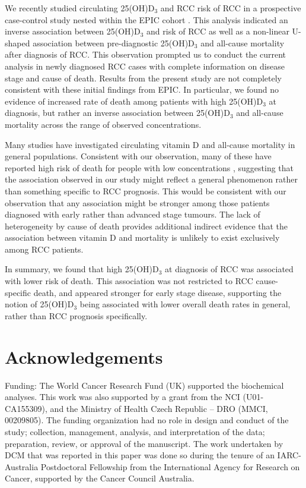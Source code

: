 \documentclass[a4paper,11pt]{article}
\renewcommand{\cite}{\citep}
\begin{document}
We recently studied circulating 25(OH)D$_3$ and RCC risk of RCC in a prospective
case-control study nested within the EPIC cohort \cite{muller_circulating_2014}.
This analysis indicated an inverse association between 
25(OH)D$_3$ and risk of RCC as well as a non-linear U-shaped association 
between pre-diagnostic 25(OH)D$_3$ and all-cause mortality after diagnosis 
of RCC. This observation prompted us to conduct the current analysis in newly 
diagnosed RCC cases with complete information on disease stage 
and cause of death. Results from the present study are not completely 
consistent with these initial findings from EPIC. In particular, we found no 
evidence of increased rate of death among patients with high 25(OH)D$_3$ at 
diagnosis, but rather an inverse association between 25(OH)D$_3$ and all-cause 
mortality across the range of observed concentrations.

Many studies have investigated circulating vitamin D and all-cause 
mortality in general populations. Consistent with our observation, many of these
have reported high risk of death for people with low concentrations 
\cite{schottker_strong_2013, virtanen_association_2011, hutchinson_low_2010, 
szulc_serum_2009, semba_low_2009, pilz_vitamin_2009, 
melamed_ml_25-hydroxyvitamin_2008, jia_nutritional_2007}, suggesting that 
the association observed in our study might reflect a general phenomenon rather 
than something specific to RCC prognosis. This would be consistent with our 
observation that any association might be stronger among those patients 
diagnosed with early rather than advanced stage tumours. The lack of 
heterogeneity by cause of death provides additional indirect evidence that the 
association between vitamin D and mortality is unlikely to exist exclusively 
among RCC patients. 

In summary, we found that high 25(OH)D$_3$ at diagnosis of RCC was associated 
with lower risk of death. This association was not restricted to RCC 
cause-specific death, and appeared stronger for early stage disease, 
supporting the notion of 25(OH)D$_3$ being associated with lower overall death 
rates in general, rather than RCC prognosis specifically. 

\section*{Acknowledgements}
\noindent Funding:
The World Cancer Research Fund (UK) supported the biochemical analyses. This work was 
also supported by a grant from the NCI (U01-CA155309), and the Ministry of Health 
Czech Republic -- DRO (MMCI, 00209805). The funding organization had no role in 
design and conduct of the study; collection, management, analysis, and 
interpretation of the data; preparation, review, or approval of the manuscript. The 
work undertaken by DCM that was reported in this paper was done so during the tenure 
of an IARC-Australia Postdoctoral Fellowship from the International Agency for 
Research on Cancer, supported by the Cancer Council Australia. 
\end{document}
